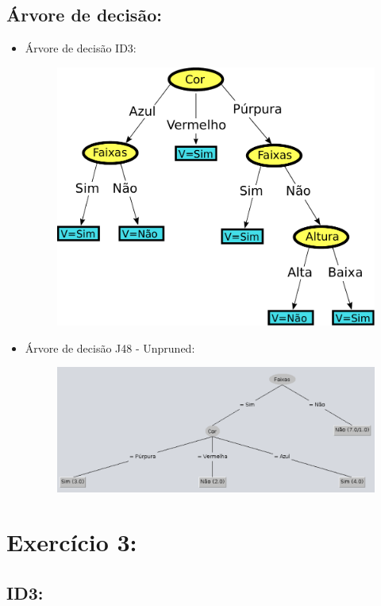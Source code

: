\documentclass[
    article,            %
    11pt,               %
    oneside,            %
    a4paper,            %
    english,            %
    brazil,             %
    sumario=tradicional,
    ]{abntex2}
\begin{document}
\subsection{\textbf{Árvore de decisão:}}
\begin{itemize}
  \item Árvore de decisão ID3:
  \begin{figure}[H]
      \centering
      \label{id3-decision-tree}
      \includegraphics[width=0.5  \textwidth]{imgs/exer2-id3-tree.pdf}
  \end{figure}

  \item Árvore de decisão J48 - Unpruned:
  \begin{figure}[H]
    \centering
    \label{j48-decision-tree}
    \includegraphics[width=\textwidth]{imgs/exer2-j48-tree.pdf}
  \end{figure}
\end{itemize}

\setcounter{section}{3}
\section*{\textbf{Exercício 3:}}

\setcounter{subsection}{0}
\subsection{\textbf{ID3:}}
\end{document}
